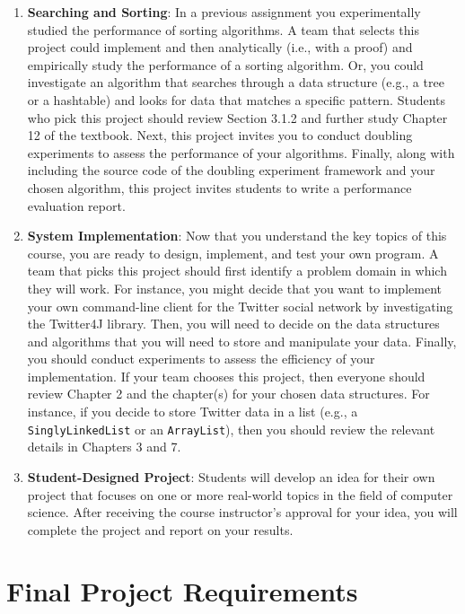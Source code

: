 \documentclass[11pt]{article}
\newcommand{\program}[1]{\lstinline{#1}}
\begin{document}
\begin{enumerate}
  \item {\bf Searching and Sorting}: In a previous assignment you experimentally
    studied the performance of sorting algorithms. A team that selects this
    project could implement and then analytically (i.e., with a proof) and
    empirically study the performance of a sorting algorithm. Or, you could
    investigate an algorithm that searches through a data structure (e.g., a
    tree or a hashtable) and looks for data that matches a specific pattern.
    Students who pick this project should review Section 3.1.2 and further study
    Chapter 12 of the textbook. Next, this project invites you to conduct
    doubling experiments to assess the performance of your algorithms. Finally,
    along with including the source code of the doubling experiment framework
    and your chosen algorithm, this project invites students to write a
    performance evaluation report.

  \item {\bf System Implementation}: Now that you understand the key topics of
    this course, you are ready to design, implement, and test your own program.
    A team that picks this project should first identify a problem domain in
    which they will work. For instance, you might decide that you want to
    implement your own command-line client for the Twitter social network by
    investigating the Twitter4J library. Then, you will need to decide on the
    data structures and algorithms that you will need to store and manipulate
    your data. Finally, you should conduct experiments to assess the efficiency
    of your implementation. If your team chooses this project, then everyone
    should review Chapter 2 and the chapter(s) for your chosen data structures.
    For instance, if you decide to store Twitter data in a list (e.g., a
    \program{SinglyLinkedList} or an \program{ArrayList}), then you should
    review the relevant details in Chapters 3 and 7.

  \item {\bf Student-Designed Project}: Students will develop an idea for their
    own project that focuses on one or more real-world topics in the field of
    computer science. After receiving the course instructor's approval for your
    idea, you will complete the project and report on your results.

\end{enumerate}

\section*{Final Project Requirements}
\end{document}

